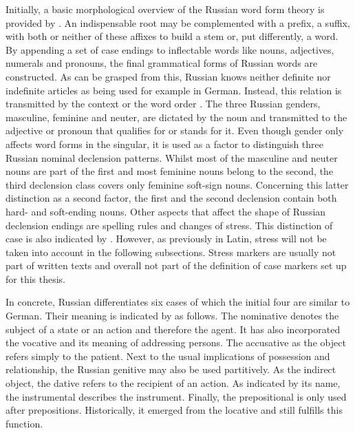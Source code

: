 \documentclass[11pt,a4paper,twoside,openright]{scrbook}
\begin{document}
Initially, a basic morphological overview of the Russian word form theory is provided by \citet{kohls2009russ}. An indispensable root may be complemented with a prefix, a suffix, with both or neither of these affixes to build a stem or, put differently, a word. By appending a set of case endings to inflectable words like nouns, adjectives, numerals and pronouns, the final grammatical forms of Russian words are constructed. As can be grasped from this, Russian knows neither definite nor indefinite articles as being used for example in German. Instead, this relation is transmitted by the context or the word order \citep{wade2020russ}. The three Russian genders, masculine, feminine and neuter, are dictated by the noun and transmitted to the adjective or pronoun that qualifies for or stands for it. Even though gender only affects word forms in the singular, it is used as a factor to distinguish three Russian nominal declension patterns. Whilst most of the masculine and neuter nouns are part of the first and most feminine nouns belong to the second, the third declension class covers only feminine soft-sign nouns. Concerning this latter distinction as a second factor, the first and the second declension contain both hard- and soft-ending nouns. Other aspects that affect the shape of Russian declension endings are spelling rules and changes of stress. This distinction of case is also indicated by \citet{blake1994case}. However, as previously in Latin, stress will not be taken into account in the following subsections. Stress markers are usually not part of written texts and overall not part of the definition of case markers set up for this thesis. 

In concrete, Russian differentiates six cases of which the initial four are similar to German. Their meaning is indicated by \citet{wade2020russ} as follows. The nominative denotes the subject of a state or an action and therefore the agent. It has also incorporated the vocative and its meaning of addressing persons. The accusative as the object refers simply to the patient. Next to the usual implications of possession and relationship, the Russian genitive may also be used partitively. As the indirect object, the dative refers to the recipient of an action. As indicated by its name, the instrumental describes the instrument. Finally, the prepositional is only used after prepositions. Historically, it emerged from the locative and still fulfills this function.
\end{document}
